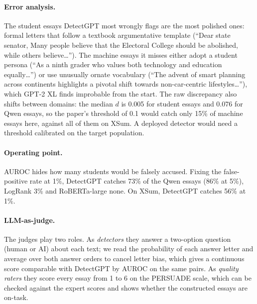 \documentclass[11pt]{article}
\begin{document}
\paragraph{Error analysis.} The student essays DetectGPT most wrongly flags are the most polished ones: formal letters that follow a textbook argumentative template (``Dear state senator, Many people believe that the Electoral College should be abolished, while others believe\ldots''). The machine essays it misses either adopt a student persona (``As a ninth grader who values both technology and education equally\ldots'') or use unusually ornate vocabulary (``The advent of smart planning across continents highlights a pivotal shift towards non-car-centric lifestyles\ldots''), which GPT-2 XL finds improbable from the start. The raw discrepancy also shifts between domains: the median $d$ is 0.005 for student essays and 0.076 for Qwen essays, so the paper's threshold of 0.1 would catch only 15\% of machine essays here, against all of them on XSum. A deployed detector would need a threshold calibrated on the target population.

\paragraph{Operating point.} AUROC hides how many students would be falsely accused. Fixing the false-positive rate at 1\%, DetectGPT catches 73\% of the Qwen essays (86\% at 5\%), LogRank 3\% and RoBERTa-large none. On XSum, DetectGPT catches 56\% at 1\%.

\paragraph{LLM-as-judge.} The judges play two roles. As \emph{detectors} they answer a two-option question (human or AI) about each text; we read the probability of each answer letter and average over both answer orders to cancel letter bias, which gives a continuous score comparable with DetectGPT by AUROC on the same pairs. As \emph{quality raters} they score every essay from 1 to 6 on the PERSUADE scale, which can be checked against the expert scores and shows whether the constructed essays are on-task.
\end{document}
